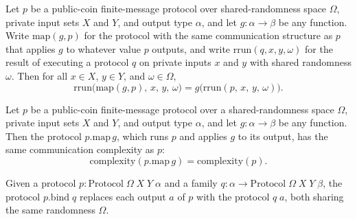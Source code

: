 \begin{theorem}
\label{CommunicationComplexity.PublicCoin.FiniteMessage.Protocol.map_rrun}
\leanok
{}
Let $p$ be a public-coin finite-message protocol over shared-randomness space $\Omega$,
private input sets $X$ and $Y$, and output type $\alpha$, and let
$g\colon\alpha\to\beta$ be any function. Write $\mathrm{map}(g,p)$ for the protocol with
the same communication structure as $p$ that applies $g$ to whatever value $p$ outputs,
and write $\mathrm{rrun}(q,x,y,\omega)$ for the result of executing a protocol $q$ on
private inputs $x$ and $y$ with shared randomness $\omega$. Then for all $x\in X$, $y\in
Y$, and $\omega\in\Omega$,
\[
\mathrm{rrun}\bigl(\mathrm{map}(g,p),\,x,\,y,\,\omega\bigr)=g\bigl(\mathrm{rrun}(p,\,x,\,y,\,\omega)\bigr).
\]
\end{theorem}

\begin{theorem}
\label{CommunicationComplexity.PublicCoin.FiniteMessage.Protocol.map_complexity}
\leanok
{}
Let $p$ be a public-coin finite-message protocol over a shared-randomness space
$\Omega$, private input sets $X$ and $Y$, and output type $\alpha$, and let $g : \alpha
\to \beta$ be any function. Then the protocol $p.\mathrm{map}\,g$, which runs $p$ and
applies $g$ to its output, has the same communication complexity as $p$:
\[
\mathrm{complexity}(p.\mathrm{map}\,g) = \mathrm{complexity}(p).
\]
\end{theorem}

\begin{definition}
\label{CommunicationComplexity.PublicCoin.FiniteMessage.Protocol.bind}
\leanok
{}
Given a protocol $p : \mathrm{Protocol}\;\Omega\;X\;Y\;\alpha$ and a family
$q : \alpha \to \mathrm{Protocol}\;\Omega\;X\;Y\;\beta$, the protocol $p.\mathrm{bind}\;q$
replaces each output $a$ of $p$ with the protocol $q\;a$, both sharing the same randomness
$\Omega$.
\end{definition}

